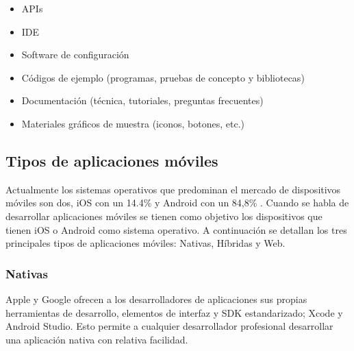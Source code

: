 \begin{itemize}
\item APIs
\item IDE
\item Software de configuración
\item Códigos de ejemplo (programas, pruebas de concepto y bibliotecas)
\item Documentación (técnica, tutoriales, preguntas frecuentes)
\item Materiales gráficos de muestra (iconos, botones, etc.)
\end{itemize}




\subsection{Tipos de aplicaciones móviles}
Actualmente los sistemas operativos que predominan el mercado de dispositivos móviles son dos, iOS con un 14.4\% y Android con un 84,8\%  \citep{statista-SO-war-mobile}. Cuando se habla de desarrollar aplicaciones móviles se tienen como objetivo los dispositivos que tienen iOS o Android como sistema operativo. A continuación se detallan los tres principales tipos de aplicaciones móviles: Nativas, Híbridas y Web.




	\subsubsection{Nativas}
	Apple y Google ofrecen a los desarrolladores de aplicaciones sus propias herramientas de desarrollo, elementos de interfaz y SDK estandarizado; Xcode y Android Studio. Esto permite a cualquier desarrollador profesional desarrollar una aplicación nativa con relativa facilidad.
	
